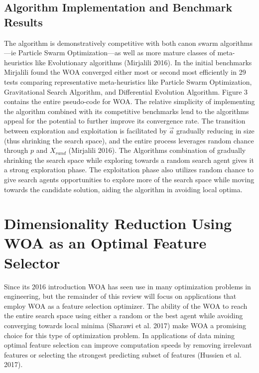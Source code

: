 \documentclass[11pt]{article}
\begin{document}
{\subsection*{Algorithm Implementation and Benchmark Results} {
    The algorithm is demonstratively competitive with both canon swarm algorithms---ie Particle Swarm Optimization---as well as more mature classes of meta-heuristics like Evolutionary algorithms (Mirjalili 2016).
    In the initial benchmarks Mirjalili found the WOA converged either most or second most efficiently in 29 tests comparing representative meta-heuristics like Particle Swarm Optimization, Gravitational Search Algorithm, and Differential Evolution Algorithm.
    Figure 3 contains the entire pseudo-code for WOA.
    The relative simplicity of implementing the algorithm combined with its competitive benchmarks lend to the algorithms appeal for the potential to further improve its convergence rate.
    The transition between exploration and exploitation is facilitated by $\vec{a}$ gradually reducing in size (thus shrinking the search space), and the entire process leverages random chance through $p$ and $X_{rand}$ (Mirjalili 2016).
    The Algorithms combination of gradually shrinking the search space while exploring towards a random search agent gives it a strong exploration phase.
    The exploitation phase also utilizes random chance to give search agents opportunities to explore more of the search space while moving towards the candidate solution, aiding the algorithm in avoiding local optima.
}

\section*{Dimensionality Reduction Using WOA as an Optimal Feature Selector} {
    Since its 2016 introduction WOA has seen use in many optimization problems in engineering, but the remainder of this review will focus on applications that employ WOA as a feature selection optimizer.
    The ability of the WOA to reach the entire search space using either a random or the best agent while avoiding converging towards local minima (Sharawi et al. 2017) make WOA a promising choice for this type of optimization problem.
    In applications of data mining optimal feature selection can improve computation speeds by removing irrelevant features or selecting the strongest predicting subset of features (Hussien et al. 2017).

}}
\end{document}

